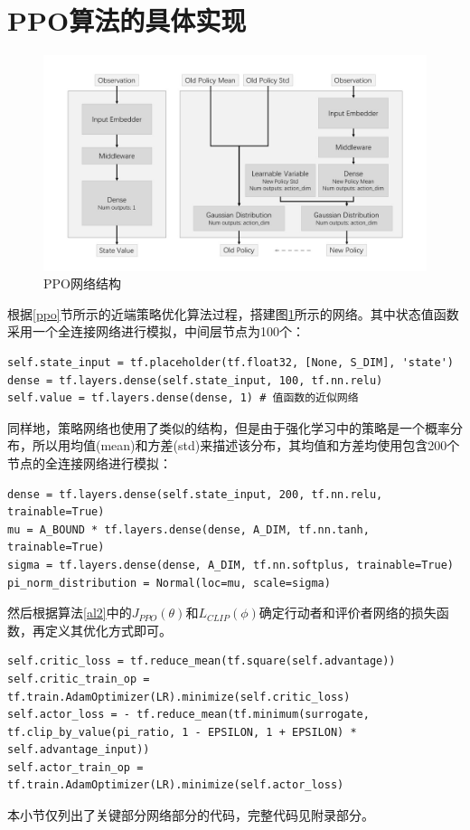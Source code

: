 \documentclass[bachelor]{thesis-uestc}
\begin{document}
	\section{PPO算法的具体实现}
	\begin{figure}[h]
		\centering
		\includegraphics[width=14cm]{./pic/ppo.jpg}
		\caption{PPO网络结构}
		\label{ppofig}
	\end{figure}
	根据\ref{ppo}节所示的近端策略优化算法过程，搭建图\ref{ppofig}所示的网络。其中状态值函数采用一个全连接网络进行模拟，中间层节点为100个：
	\begin{lstlisting}
self.state_input = tf.placeholder(tf.float32, [None, S_DIM], 'state')
dense = tf.layers.dense(self.state_input, 100, tf.nn.relu)
self.value = tf.layers.dense(dense, 1) # 值函数的近似网络
	\end{lstlisting}
	同样地，策略网络也使用了类似的结构，但是由于强化学习中的策略是一个概率分布，所以用均值(mean)和方差(std)来描述该分布，其均值和方差均使用包含200个节点的全连接网络进行模拟：
	\begin{lstlisting}
dense = tf.layers.dense(self.state_input, 200, tf.nn.relu, trainable=True)
mu = A_BOUND * tf.layers.dense(dense, A_DIM, tf.nn.tanh, trainable=True)
sigma = tf.layers.dense(dense, A_DIM, tf.nn.softplus, trainable=True)
pi_norm_distribution = Normal(loc=mu, scale=sigma)
	\end{lstlisting}
	然后根据算法\ref{al2}中的$J_{PPO}(\theta)$和$L_{CLIP}(\phi)$确定行动者和评价者网络的损失函数，再定义其优化方式即可。
	\begin{lstlisting}
self.critic_loss = tf.reduce_mean(tf.square(self.advantage))
self.critic_train_op = tf.train.AdamOptimizer(LR).minimize(self.critic_loss)
self.actor_loss = - tf.reduce_mean(tf.minimum(surrogate, tf.clip_by_value(pi_ratio, 1 - EPSILON, 1 + EPSILON) * self.advantage_input))
self.actor_train_op = tf.train.AdamOptimizer(LR).minimize(self.actor_loss)
	\end{lstlisting}
	本小节仅列出了关键部分网络部分的代码，完整代码见附录部分。
	
\end{document}
